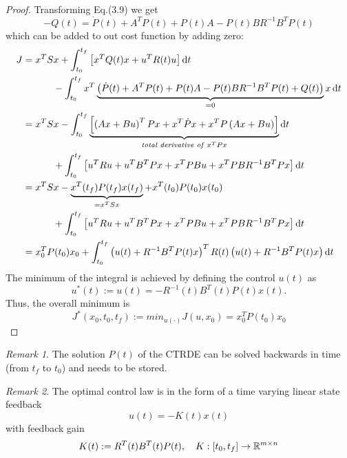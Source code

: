 \documentclass[paper=a4, pagesize, DIV=calc, BCOR=12.5mm, twoside=on, onecolumn=on, open = any, titlepage =on, parskip =half-, headsepline = on, footsepline = on, chapterprefix = on, appendixprefix = off, fontsize = 12pt, numbers = noenddot, abstract = on]{scrbook}
\numberwithin{equation}{chapter}
\theoremstyle{definition}
\theoremstyle{plain}
\theoremstyle{plain}
\theoremstyle{remark}
\newtheorem{bemerkung}{Remark}
\theoremstyle{plain}
\theoremstyle{plain}
\begin{document}
\begin{proof}
Transforming Eq.(3.9) we get 
\begin{equation}
-Q(t) = \dot{P}(t) + A^TP(t) + P(t)A - P(t)BR^{-1}B^TP(t)
\end{equation}
which can be added to out cost function by adding zero:
\begin{align*}
J &= x^TSx + \int_{t_0}^{t_f} \left[x^TQ(t)x + u^TR(t)u \right] \mathop{}\!\mathrm{d} t\\
  & \qquad \quad \, - \int_{t_0}^{t_f} x^T \underbrace{\left( \dot{P}(t) + A^TP(t) + P(t)A - P(t)BR^{-1}B^TP(t) + Q(t) \right)}_{= 0}x \mathop{}\!\mathrm{d} t\\
  &= x^TSx - \int_{t_0}^{t_f} \underbrace{\left[ \left(Ax +Bu\right)^TPx + x^T\dot{P}x + x^TP\left(Ax + Bu\right)\right]}_{\text{\emph{total derivative of} } x^TPx} \mathop{}\!\mathrm{d} t\\
  & \qquad \quad \, + \int_{t_0}^{t_f}\left[u^TRu + u^TB^TPx + x^TPBu + x^TPBR^{-1}B^TPx \right] \mathop{}\!\mathrm{d} t\\
  &= x^TSx - \underbrace{x^T(t_f)P(t_f)x(t_f)}_{= x^TSx} + x^T(t_0)P(t_0)x(t_0)\\
  & \qquad \quad \, + \int_{t_0}^{t_f}\left[u^TRu + u^TB^TPx + x^TPBu + x^TPBR^{-1}B^TPx \right] \mathop{}\!\mathrm{d} t\\
  &= x_0^TP(t_0)x_0 + \int_{t_0}^{t_f} \left(u(t) + R^{-1}B^TP(t)x \right)^T R(t) \left(u(t) + R^{-1}B^TP(t)x \right) \mathop{}\!\mathrm{d} t
\end{align*}
The minimum of the integral is achieved by defining the control $u(t)$ as
\[
u^*(t) := u(t) = -R^{-1}(t)B^T(t)P(t)x(t).
\]
Thus, the overall minimum is
\[
J^*(x_0,t_0,t_f) := min_{u(\cdot)}J(u, x_0) = x_0^TP(t_0)x_0
\]
\end{proof}
\vspace*{4ex}
\begin{bemerkung}{\cite{li:2006}} \newline
The solution $P(t)$ of the CTRDE can be solved backwards in time (from $t_f$ to $t_0$) and needs to be stored. 
\end{bemerkung}
\newpage
\begin{bemerkung}{\cite{li:2006}} \newline
The optimal control law is in the form of a time varying linear state feedback \begin{equation}u(t) = -K(t)x(t) \label{eq:u(t) optimal control law} \end{equation} with feedback gain \begin{equation}K(t) := R^T(t)B^T(t)P(t), \quad K:\left[t_0, t_f\right] \rightarrow \mathbb{R}^{m\times n}\end{equation}
\end{bemerkung}
\end{document}
